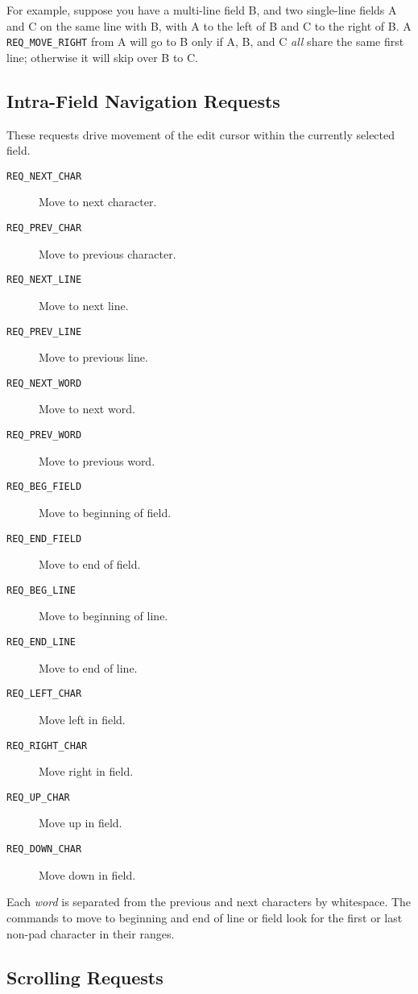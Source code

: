 For example, suppose you have a multi-line field B, and two
single-line fields A and C on the same line with B, with A to the left
of B and C to the right of B.  A \texttt{REQ\_MOVE\_RIGHT} from A will
go to B only if A, B, and C \emph{all} share the same first line;
otherwise it will skip over B to C.

\subsection{Intra-Field Navigation Requests}

These requests drive movement of the edit cursor within the currently
selected field.
\begin{description}
\item[ \texttt{REQ\_NEXT\_CHAR}]  Move to next character.
\item[ \texttt{REQ\_PREV\_CHAR}]  Move to previous character.
\item[ \texttt{REQ\_NEXT\_LINE}]  Move to next line.
\item[ \texttt{REQ\_PREV\_LINE}]  Move to previous line.
\item[ \texttt{REQ\_NEXT\_WORD}]  Move to next word.
\item[ \texttt{REQ\_PREV\_WORD}]  Move to previous word.
\item[ \texttt{REQ\_BEG\_FIELD}]  Move to beginning of field.
\item[ \texttt{REQ\_END\_FIELD}]  Move to end of field.
\item[ \texttt{REQ\_BEG\_LINE}]  Move to beginning of line.
\item[ \texttt{REQ\_END\_LINE}]  Move to end of line.
\item[ \texttt{REQ\_LEFT\_CHAR}]  Move left in field.
\item[ \texttt{REQ\_RIGHT\_CHAR}]  Move right in field.
\item[ \texttt{REQ\_UP\_CHAR}]  Move up in field.
\item[ \texttt{REQ\_DOWN\_CHAR}]  Move down in field.
\end{description}
Each \emph{word} is separated from the previous and next characters
by whitespace.  The commands to move to beginning and end of line or field
look for the first or last non-pad character in their ranges.

\subsection{Scrolling Requests}

